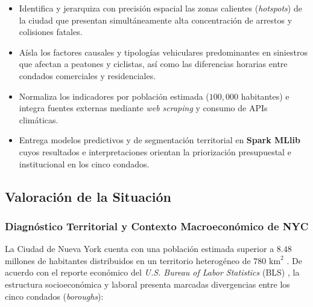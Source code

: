 \documentclass[11pt,a4paper]{article}
\begin{document}
\begin{itemize}
    \item Identifica y jerarquiza con precisión espacial las zonas calientes (\textit{hotspots}) de la ciudad que presentan simultáneamente alta concentración de arrestos y colisiones fatales.
    \item Aísla los factores causales y tipologías vehiculares predominantes en siniestros que afectan a peatones y ciclistas, así como las diferencias horarias entre condados comerciales y residenciales.
    \item Normaliza los indicadores por población estimada ($100,000$ habitantes) e integra fuentes externas mediante \textit{web scraping} y consumo de APIs climáticas.
    \item Entrega modelos predictivos y de segmentación territorial en \textbf{Spark MLlib} cuyos resultados e interpretaciones orientan la priorización presupuestal e institucional en los cinco condados.
\end{itemize}

\subsection{Valoración de la Situación}

\subsubsection{Diagnóstico Territorial y Contexto Macroeconómico de NYC}

La Ciudad de Nueva York cuenta con una población estimada superior a $8.48$ millones de habitantes distribuidos en un territorio heterogéneo de $780\text{ km}^2$ \cite{us_census_quickfacts_nyc}. De acuerdo con el reporte económico del \textit{U.S. Bureau of Labor Statistics} (BLS) \cite{bls_nyc_2024}, la estructura socioeconómica y laboral presenta marcadas divergencias entre los cinco condados (\textit{boroughs}):
\end{document}
